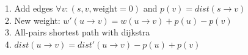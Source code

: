 
1. Add edges $\forall v:(s, v, \text{weight}=0)$ and $p(v) = dist(s \rightarrow v)$\\
2. New weight: $w'(u \rightarrow v) = w(u \rightarrow v) + p(u) - p(v)$\\
3. All-pairs shortest path with dijkstra\\
4. $dist(u \rightarrow v) = dist'(u \rightarrow v) - p(u) + p(v)$
